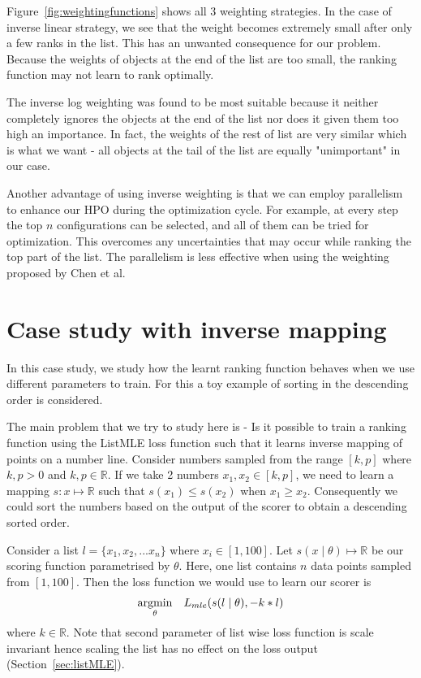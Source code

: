 \documentclass[12pt, twoside, ngerman]{report}
\begin{document}
Figure~\ref{fig:weightingfunctions} shows all 3 weighting strategies.
In the case of inverse linear strategy,  we see that the weight becomes extremely small after only a few ranks in the list.
This has an unwanted consequence for our problem.
Because the weights of objects at the end of the list are too small,  the ranking function may not learn to rank optimally.

The inverse log weighting was found to be most suitable because it neither completely ignores the objects at the end of the list nor does it given them too high an importance.
In fact,  the weights of the rest of list are very similar which is what we want - all objects at the tail of the list are equally "unimportant" in our case.

Another advantage of using inverse weighting is that we can employ parallelism to enhance our HPO during the optimization cycle.
For example,  at every step the top $n$ configurations can be selected,  and all of them can be tried for optimization.
This overcomes any uncertainties that may occur while ranking the top part of the list. 
The parallelism is less effective when using the weighting proposed by Chen et al.

    
\section{Case study with inverse mapping}

In this case study,  we study how the learnt ranking function behaves when we use different parameters to train.
For this a toy example of sorting in the descending order is considered.
    
The main problem that we try to study here is - Is it possible to train a ranking function using the ListMLE loss function such that it learns inverse mapping of points on a number line.
Consider numbers sampled from the range $[k,  p]$ where $k,p > 0$ and  $k,p \in \mathbb{R}$.
If we take 2 numbers $x_1, x_2 \in [k,  p]$,  we need to learn a mapping $s: x \mapsto \mathbb{R}$ such that $s(x_1) \leq s(x_2)$ when $x_1 \geq x_2$.
Consequently we could sort the numbers based on the output of the scorer to obtain a descending sorted order.

Consider a list $l = \{x_1, x_2, ...x_n\}$ where $x_i \in [1, 100]$.
Let $s(x \mid \theta) \mapsto \mathbb{R}$ be our scoring function parametrised by $\theta$.
Here, one list contains $n$ data points sampled from $[1, 100]$.
Then the loss function we would use to learn our scorer is
\begin{equation}
\underset{\theta}{\rm argmin} \quad L_{mle}(s(l \mid \theta),  - k * l)
\end{equation}
where $k \in \mathbb{R}$.
Note that second parameter of list wise loss function is scale invariant hence scaling the list has no effect on the loss output (Section~\ref{sec:listMLE}).
\end{document}
